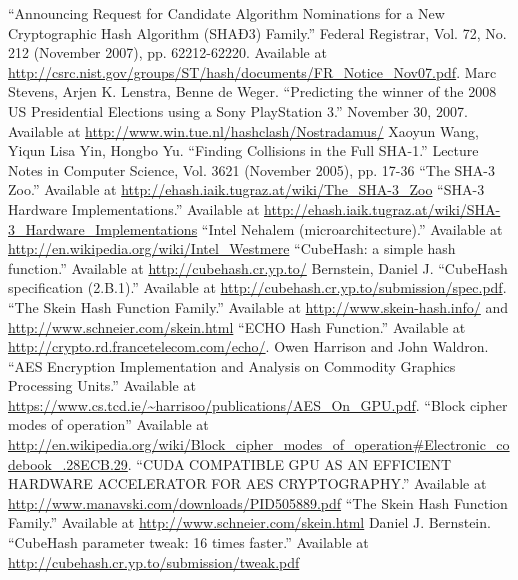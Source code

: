 \begin{thebibliography}{9}
   ``Announcing Request for Candidate Algorithm Nominations for a New Cryptographic Hash Algorithm (SHAÐ3) Family.'' Federal Registrar, Vol. 72, No. 212 (November 2007), pp. 62212-62220. Available at \url{http://csrc.nist.gov/groups/ST/hash/documents/FR_Notice_Nov07.pdf}.
   Marc Stevens, Arjen K. Lenstra, Benne de Weger. ``Predicting the winner of the 2008 US Presidential Elections using a Sony PlayStation 3.'' November 30, 2007. Available at \url{http://www.win.tue.nl/hashclash/Nostradamus/}
   Xaoyun Wang, Yiqun Lisa Yin, Hongbo Yu. ``Finding Collisions in the Full SHA-1.'' Lecture Notes in Computer Science, Vol. 3621 (November 2005), pp. 17-36
   ``The SHA-3 Zoo.'' Available at \url{http://ehash.iaik.tugraz.at/wiki/The_SHA-3_Zoo}
   ``SHA-3 Hardware Implementations.'' Available at \url{http://ehash.iaik.tugraz.at/wiki/SHA-3_Hardware_Implementations}
   ``Intel Nehalem (microarchitecture).'' Available at \url{http://en.wikipedia.org/wiki/Intel_Westmere}
   ``CubeHash: a simple hash function.'' Available at \url{http://cubehash.cr.yp.to/}
   Bernstein, Daniel J. ``CubeHash specification (2.B.1).'' Available at \url{http://cubehash.cr.yp.to/submission/spec.pdf}.
   ``The Skein Hash Function Family.'' Available at \url{http://www.skein-hash.info/} and \url{http://www.schneier.com/skein.html}
   ``ECHO Hash Function.'' Available at \url{http://crypto.rd.francetelecom.com/echo/}.
   Owen Harrison and John Waldron. ``AES Encryption Implementation and Analysis on Commodity Graphics Processing Units.'' Available at \url{https://www.cs.tcd.ie/~harrisoo/publications/AES_On_GPU.pdf}.
   ``Block cipher modes of operation'' Available at \url{http://en.wikipedia.org/wiki/Block_cipher_modes_of_operation#Electronic_codebook_.28ECB.29}.
   ``CUDA COMPATIBLE GPU AS AN EFFICIENT HARDWARE ACCELERATOR FOR AES CRYPTOGRAPHY.'' Available at \url{http://www.manavski.com/downloads/PID505889.pdf}
   ``The Skein Hash Function Family.'' Available at \url{http://www.schneier.com/skein.html}
   Daniel J. Bernstein. ``CubeHash parameter tweak: 16 times faster.'' Available at \url{http://cubehash.cr.yp.to/submission/tweak.pdf}
\end{thebibliography}
